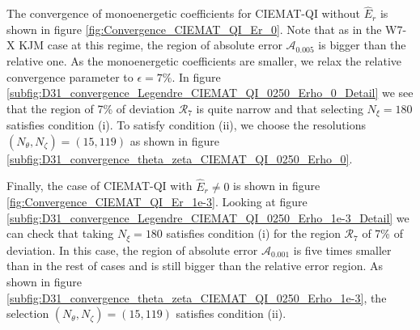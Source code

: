 \documentclass[10pt]{iopart}
\begin{document}
The convergence of monoenergetic coefficients for CIEMAT-QI without $\widehat{E}_r$ is shown in figure \ref{fig:Convergence_CIEMAT_QI_Er_0}. Note that as in the W7-X KJM case at this regime, the region of absolute error $\mathcal{A}_{0.005}$ is bigger than the relative one. As the monoenergetic coefficients are smaller, we relax the relative convergence parameter to $\epsilon=7\%$. In figure \ref{subfig:D31_convergence_Legendre_CIEMAT_QI_0250_Erho_0_Detail} we see that the region of 7\% of deviation $\mathcal{R}_{7}$ is quite narrow and that selecting $N_\xi=180$ satisfies condition (i). To satisfy condition (ii), we choose the resolutions $(N_\theta,N_\zeta)=(15,119)$ as shown in figure \ref{subfig:D31_convergence_theta_zeta_CIEMAT_QI_0250_Erho_0}. 



Finally, the case of CIEMAT-QI with $\widehat{E}_r\ne 0$ is shown in figure \ref{fig:Convergence_CIEMAT_QI_Er_1e-3}. Looking at figure \ref{subfig:D31_convergence_Legendre_CIEMAT_QI_0250_Erho_1e-3_Detail} we can check that taking $N_\xi=180$ satisfies condition (i) for the region $\mathcal{R}_7$ of 7\% of deviation. In this case, the region of absolute error $\mathcal{A}_{0.001}$ is five times smaller than in the rest of cases and is still bigger than the relative error region. As shown in figure \ref{subfig:D31_convergence_theta_zeta_CIEMAT_QI_0250_Erho_1e-3}, the selection $(N_\theta,N_\zeta)=(15,119)$ satisfies condition (ii).
\end{document}

